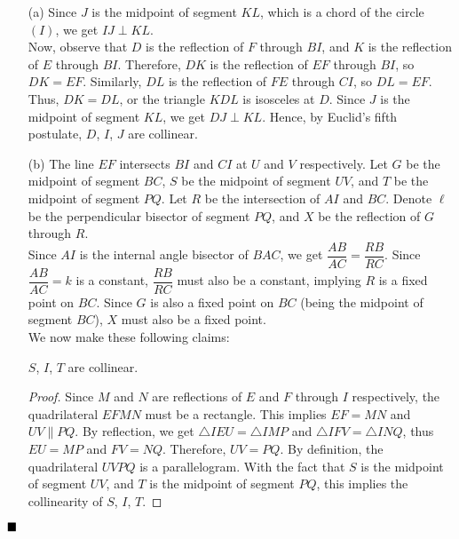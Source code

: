\documentclass[11pt]{article}
\newenvironment{solution}[1][Solution]{%
  \proof[\normalfont \faPenNib \hspace{0.2cm} \ttfamily \scshape \large #1]%
}{\(\hfill \blacksquare\){\parfillskip0pt\par}}
\theoremstyle{definition}
\begin{document}
        \begin{solution}
            \hfill
            \begin{enumerate}
                \item[(a)] Since \(J\) is the midpoint of segment \(KL\), which is a chord of the circle \((I)\), we get \(IJ \perp KL\).\\
                Now, observe that \(D\) is the reflection of \(F\) through \(BI\), and \(K\) is the reflection of \(E\) through \(BI\). Therefore, \(DK\) is the reflection of \(EF\) through \(BI\), so \(DK = EF\). Similarly, \(DL\) is the reflection of \(FE\) through \(CI\), so \(DL = EF\). Thus, \(DK = DL\), or the triangle \(KDL\) is isosceles at \(D\). Since \(J\) is the midpoint of segment \(KL\), we get \(DJ \perp KL\). Hence, by Euclid's fifth postulate, \(D\), \(I\), \(J\) are collinear.
                
                \item[(b)] The line \(EF\) intersects \(BI\) and \(CI\) at \(U\) and \(V\) respectively. Let \(G\) be the midpoint of segment \(BC\), \(S\) be the midpoint of segment \(UV\), and \(T\) be the midpoint of segment \(PQ\). Let \(R\) be the intersection of \(AI\) and \(BC\). Denote \(\ell\) be the perpendicular bisector of segment \(PQ\), and \(X\) be the reflection of \(G\) through \(R\).\\
                Since \(AI\) is the internal angle bisector of \(BAC\), we get \(\dfrac{AB}{AC} = \dfrac{RB}{RC}\). Since \(\dfrac{AB}{AC} = k\) is a constant, \(\dfrac{RB}{RC}\) must also be a constant, implying \(R\) is a fixed point on \(BC\). Since \(G\) is also a fixed point on \(BC\) (being the midpoint of segment \(BC\)), \(X\) must also be a fixed point.\\
                We now make these following claims:

                \begin{claim}
                    \(S\), \(I\), \(T\) are collinear.
                \end{claim}

                \begin{proof}
                    Since \(M\) and \(N\) are reflections of \(E\) and \(F\) through \(I\) respectively, the quadrilateral \(EFMN\) must be a rectangle. This implies \(EF = MN\) and \(UV \parallel PQ\). By reflection, we get \(\triangle IEU = \triangle IMP\) and \(\triangle IFV = \triangle INQ\), thus \(EU = MP\) and \(FV = NQ\). Therefore, \(UV = PQ\). By definition, the quadrilateral \(UVPQ\) is a parallelogram. With the fact that \(S\) is the midpoint of segment \(UV\), and \(T\) is the midpoint of segment \(PQ\), this implies the collinearity of \(S\), \(I\), \(T\).
                \end{proof}
                

\end{enumerate}
\end{solution}
\end{document}

